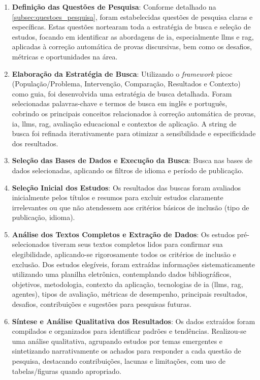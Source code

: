 \begin{enumerate}
    \item \textbf{Definição das Questões de Pesquisa}: Conforme detalhado na \autoref{subsec:questoes_pesquisa}, foram estabelecidas questões de pesquisa claras e específicas. Estas questões nortearam toda a estratégia de busca e seleção de estudos, focando em identificar as abordagens de \gls{ia}, especialmente \gls{llm}s e \gls{rag}, aplicadas à correção automática de provas discursivas, bem como os desafios, métricas e oportunidades na área.

    \item \textbf{Elaboração da Estratégia de Busca}: Utilizando o \textit{framework} \gls{picoc} \cite{kitchenham_guidelines_2007} (População/Problema, Intervenção, Comparação, Resultados e Contexto) como guia, foi desenvolvida uma estratégia de busca detalhada. Foram selecionadas palavras-chave e termos de busca em inglês e português, cobrindo os principais conceitos relacionados à correção automática de provas, \gls{ia}, \gls{llm}s, \gls{rag}, avaliação educacional e contextos de aplicação. A string de busca foi refinada iterativamente para otimizar a sensibilidade e especificidade dos resultados.

    \item \textbf{Seleção das Bases de Dados e Execução da Busca}: Busca nas bases de dados selecionadas, aplicando os filtros de idioma e período de publicação.

    \item \textbf{Seleção Inicial dos Estudos}: Os resultados das buscas foram avaliados inicialmente pelos títulos e resumos para excluir estudos claramente irrelevantes ou que não atendessem aos critérios básicos de inclusão (tipo de publicação, idioma).

    \item \textbf{Análise dos Textos Completos e Extração de Dados}: Os estudos pré-selecionados tiveram seus textos completos lidos para confirmar sua elegibilidade, aplicando-se rigorosamente todos os critérios de inclusão e exclusão. Dos estudos elegíveis, foram extraídas informações sistematicamente utilizando uma planilha eletrônica, contemplando dados bibliográficos, objetivos, metodologia, contexto da aplicação, tecnologias de \gls{ia} (\gls{llm}s, \gls{rag}, agentes), tipos de avaliação, métricas de desempenho, principais resultados, desafios, contribuições e sugestões para pesquisas futuras.

    \item \textbf{Síntese e Análise Qualitativa dos Resultados}: Os dados extraídos foram compilados e organizados para identificar padrões e tendências. Realizou-se uma análise qualitativa, agrupando estudos por temas emergentes e sintetizando narrativamente os achados para responder a cada questão de pesquisa, destacando contribuições, lacunas e limitações, com uso de tabelas/figuras quando apropriado.
\end{enumerate}

